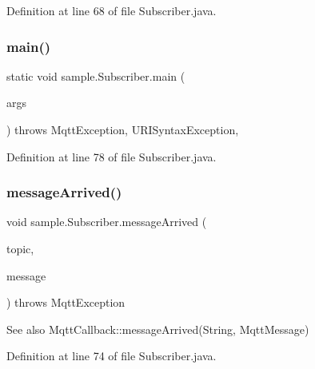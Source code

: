Definition at line 68 of file Subscriber.\+java.

\mbox{\label{classsample_1_1_subscriber_a08afc10c181a3245ba83ed84f3317d1b}} 
\subsubsection{\texorpdfstring{main()}{main()}}
{\footnotesize\ttfamily static void sample.\+Subscriber.\+main (\begin{DoxyParamCaption}\item[{String \mbox{[}$\,$\mbox{]}}]{args }\end{DoxyParamCaption}) throws Mqtt\+Exception, U\+R\+I\+Syntax\+Exception\hspace{0.3cm}{\ttfamily [inline]}, {\ttfamily [static]}}



Definition at line 78 of file Subscriber.\+java.

\mbox{\label{classsample_1_1_subscriber_a3060c3fd5b9078142a96dc2cd9beb7b9}} 
\subsubsection{\texorpdfstring{message\+Arrived()}{messageArrived()}}
{\footnotesize\ttfamily void sample.\+Subscriber.\+message\+Arrived (\begin{DoxyParamCaption}\item[{String}]{topic,  }\item[{Mqtt\+Message}]{message }\end{DoxyParamCaption}) throws Mqtt\+Exception\hspace{0.3cm}{\ttfamily [inline]}}

\begin{DoxySeeAlso}{See also}
Mqtt\+Callback\+::message\+Arrived(\+String, Mqtt\+Message) 
\end{DoxySeeAlso}


Definition at line 74 of file Subscriber.\+java.

\mbox{\label{classsample_1_1_subscriber_ac15365eaf8f4d15cf8c8263629d186c4}} 
